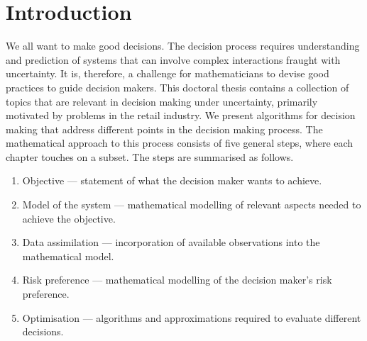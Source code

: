 \documentclass[main.tex]{subfiles}
\begin{document}
\chapter{Introduction}
We all want to make good decisions. The decision
process requires understanding and prediction of systems that can
involve complex interactions fraught with uncertainty. It is, therefore,
a challenge for mathematicians to devise good practices
to guide decision makers.
This doctoral thesis contains a collection of topics that are relevant
in decision making under uncertainty, primarily motivated by
problems in the retail industry.
We present algorithms for decision making that address different
points in the decision making process.
The mathematical approach to this process consists of
five general steps, where each chapter touches on a subset.
The steps are summarised as follows.
\begin{enumerate}\label{enum:making_decisions}
\item Objective --- statement of what the decision maker wants to achieve.
\item Model of the system --- mathematical modelling of relevant aspects
  needed to achieve the objective.
\item Data assimilation --- incorporation of available observations into
  the mathematical model.
\item Risk preference --- mathematical modelling of the decision maker's risk
  preference.
\item Optimisation --- algorithms and approximations required to
  evaluate different decisions.
\end{enumerate}
\end{document}
